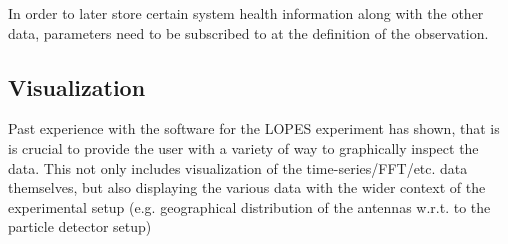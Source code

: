 \documentclass[a4paper,10pt,bibtotoc]{scrartcl}
\begin{document}
In order to later store certain system health information along with the other
data, parameters need to be subscribed to at the definition of the observation.

\subsection{Visualization}

Past experience with the software for the LOPES experiment has shown, that is
is crucial to provide the user with a variety of way to graphically inspect
the data. This not only includes visualization of the time-series/FFT/etc.
data themselves, but also displaying the various data with the wider context
of the experimental setup (e.g. geographical distribution of the antennas
w.r.t. to the particle detector setup)
\end{document}
